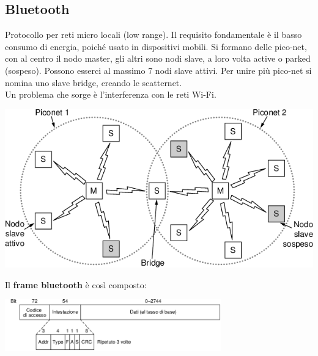 \documentclass[10pt,a4paper,twoside]{article}
\begin{document}
\subsection{Bluetooth}
\begin{minipage}{0.55\textwidth}
Protocollo per reti micro locali (low range). Il requisito fondamentale è il basso consumo di energia, poiché usato in dispositivi mobili. Si formano delle pico-net, con al centro il nodo master, gli altri sono nodi slave, a loro volta active o parked (sospeso). Possono esserci al massimo 7 nodi slave attivi. Per unire più pico-net si nomina uno slave bridge, creando le scatternet.\\Un problema che sorge è l'interferenza con le reti Wi-Fi.
\end{minipage}
\begin{minipage}{0.45\textwidth}
\includegraphics[width=\textwidth]{images/pico_net.png}
\end{minipage}
Il \textbf{frame bluetooth} è così composto:
\begin{center}
\includegraphics[width=0.7\textwidth]{images/frame_bluetooth.png}
\end{center}
\end{document}
